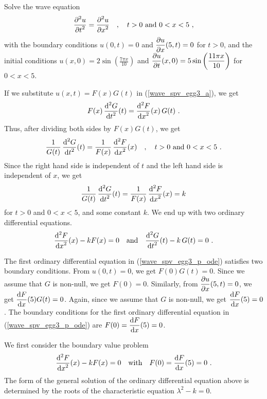 \begin{egg}
Solve the wave equation
\begin{equation} \label{wave_spv_egg3_a}
\frac{\displaystyle \partial^{2}{u}} {\displaystyle \partial t^{2}} = \frac{\displaystyle \partial^{2}{u}} {\displaystyle \partial x^{2}} \quad , \quad t > 0 \
\text{and} \ 0 < x < 5 \ ,
\end{equation}
with the boundary conditions
$u(0,t) = 0$ and $\displaystyle \frac{\partial{u}}{\partial x}(5,t) = 0$ for $t > 0$,
and the initial conditions
$\displaystyle u(x,0) = 2 \sin\left(\frac{7\pi x}{10}\right)$
and
$\displaystyle \frac{\partial{u}}{\partial t}(x,0) = 5 \sin\left(\frac{11 \pi x}{10}\right)$
for $0 < x < 5$.

If we substitute $u(x,t) = F(x)G(t)$ in (\ref{wave_spv_egg3_a}), we get
\[
F(x)\,\frac{\displaystyle \mathrm{d}^{2}{G}} {\displaystyle \mathrm{d}{t}^{2}}(t) = \frac{\displaystyle \mathrm{d}^{2}{F}} {\displaystyle \mathrm{d}{x}^{2}}(x)\, G(t) \ .
\]
Thus, after dividing both sides by $F(x)G(t)$, we get
\[
\frac{1}{G(t)} \, \frac{\displaystyle \mathrm{d}^{2}{G}} {\displaystyle \mathrm{d}{t}^{2}}(t) = \frac{1}{F(x)}\, \frac{\displaystyle \mathrm{d}^{2}{F}} {\displaystyle \mathrm{d}{x}^{2}}(x)
\quad , \quad t>0 \ \text{and} \ 0<x<5 \ .
\]
Since the right hand side is independent of $t$ and the left hand side
is independent of $x$, we get
\[
\frac{1}{G(t)} \, \frac{\displaystyle \mathrm{d}^{2}{G}} {\displaystyle \mathrm{d}{t}^{2}}(t) = \frac{1}{F(x)}\,
\frac{\displaystyle \mathrm{d}^{2}{F}} {\displaystyle \mathrm{d}{x}^{2}}(x) = k
\]
for $t>0$ and $0<x<5$, and some constant $k$.  We end up with two
ordinary differential equations.
\begin{equation} \label{wave_spv_egg3_p_ode}
\frac{\displaystyle \mathrm{d}^{2}{F}} {\displaystyle \mathrm{d}{x}^{2}}(x) -k F(x) = 0 \quad \text{and}
\quad \frac{\displaystyle \mathrm{d}^{2}{G}} {\displaystyle \mathrm{d}{t}^{2}}(t) - k\,G(t) = 0 \ .
\end{equation}

The first ordinary differential equation in
(\ref{wave_spv_egg3_p_ode}) satisfies two boundary
conditions.   From $u(0,t) = 0$, we get $F(0)G(t)=0$.  Since we assume
that $G$ is non-null, we get $F(0)=0$.  Similarly, from
$\displaystyle \frac{\partial{u}}{\partial x}(5,t) = 0$, we get
$\displaystyle \frac{\mathrm{d}F}{\mathrm{d}{x}}(5)G(t)=0$.
Again, since we assume that $G$ is non-null, we get
$\displaystyle \frac{\mathrm{d}F}{\mathrm{d}{x}}(5)=0$.  The
boundary conditions for the first ordinary differential equation in
(\ref{wave_spv_egg3_p_ode}) are $\displaystyle F(0)=\frac{\mathrm{d}F}{\mathrm{d}{x}}(5)=0$. 

We first consider the boundary value problem
\begin{equation} \label{wave_spv_egg3_p_bvp}
\frac{\displaystyle \mathrm{d}^{2}{F}} {\displaystyle \mathrm{d}{x}^{2}}(x) -k F(x) = 0 \quad \text{with} \quad
F(0)=\frac{\mathrm{d}F}{\mathrm{d}{x}}(5)=0 \ .
\end{equation}
The form of the general solution of the ordinary differential equation
above is determined by the roots of the characteristic equation
$\displaystyle \lambda^2-k=0$.


\end{egg}
